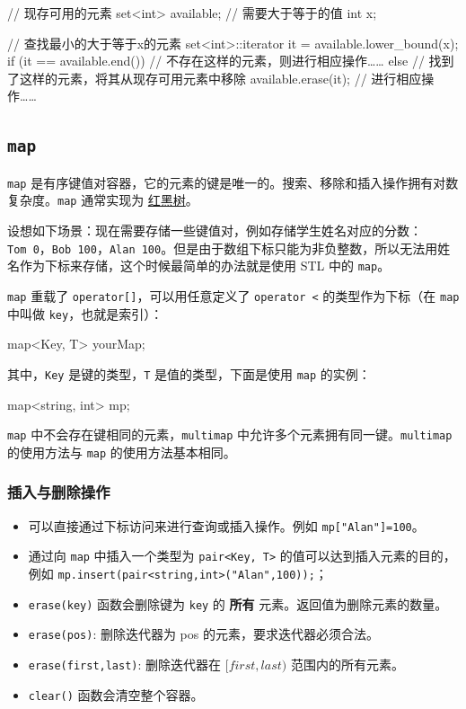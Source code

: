 \begin{codeline}
// 现存可用的元素
set<int> available;
// 需要大于等于的值
int x;

// 查找最小的大于等于x的元素
set<int>::iterator it = available.lower_bound(x);
if (it == available.end()) {
  // 不存在这样的元素，则进行相应操作……
} else {
  // 找到了这样的元素，将其从现存可用元素中移除
  available.erase(it);
  // 进行相应操作……
}
\end{codeline}


\subsection{\texorpdfstring{\texttt{map}}{map}}\label{map}

\texttt{map} 是有序键值对容器，它的元素的键是唯一的。搜索、移除和插入操作拥有对数复杂度。\texttt{map} 通常实现为 \href{../../ds/rbtree.md}{红黑树}。

设想如下场景：现在需要存储一些键值对，例如存储学生姓名对应的分数：\texttt{Tom\ 0}，\texttt{Bob\ 100}，\texttt{Alan\ 100}。但是由于数组下标只能为非负整数，所以无法用姓名作为下标来存储，这个时候最简单的办法就是使用 STL 中的 \texttt{map}。

\texttt{map} 重载了 \texttt{operator{[}{]}}，可以用任意定义了 \texttt{operator\ \textless{}} 的类型作为下标（在 \texttt{map} 中叫做 \texttt{key}，也就是索引）：


\begin{codeline}
map<Key, T> yourMap;
\end{codeline}


其中，\texttt{Key} 是键的类型，\texttt{T} 是值的类型，下面是使用 \texttt{map} 的实例：


\begin{codeline}
map<string, int> mp;
\end{codeline}


\texttt{map} 中不会存在键相同的元素，\texttt{multimap} 中允许多个元素拥有同一键。\texttt{multimap} 的使用方法与 \texttt{map} 的使用方法基本相同。

\subsubsection{插入与删除操作}\label{ux63d2ux5165ux4e0eux5220ux9664ux64cdux4f5c-1}

\begin{itemize}
\tightlist
\item
  可以直接通过下标访问来进行查询或插入操作。例如 \texttt{mp{[}"Alan"{]}=100}。
\item
  通过向 \texttt{map} 中插入一个类型为 \texttt{pair\textless{}Key,\ T\textgreater{}} 的值可以达到插入元素的目的，例如 \texttt{mp.insert(pair\textless{}string,int\textgreater{}("Alan",100));}；
\item
  \texttt{erase(key)} 函数会删除键为 \texttt{key} 的 \textbf{所有} 元素。返回值为删除元素的数量。
\item
  \texttt{erase(pos)}: 删除迭代器为 pos 的元素，要求迭代器必须合法。
\item
  \texttt{erase(first,last)}: 删除迭代器在 \([first,last)\) 范围内的所有元素。
\item
  \texttt{clear()} 函数会清空整个容器。
\end{itemize}

